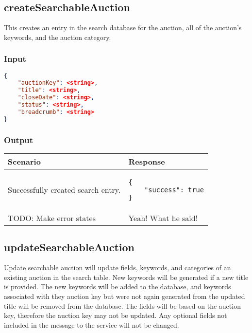 \documentclass[12pt,a4paper]{article}
\begin{document}
\subsection{createSearchableAuction}
\label{ref:csa}
This creates an entry in the search database for the auction, all of the
auction's keywords, and the auction category.

\subsubsection{Input}
\begin{lstlisting}[language=json,firstnumber=1]
{
    "auctionKey": <string>,
    "title": <string>,
    "closeDate": <string>,
    "status": <string>,
    "breadcrumb": <string>
}
\end{lstlisting}

\subsubsection{Output}
\begin{center}
    \begin{tabular}{| p{5cm} | l |}
        \hline
        \textbf{Scenario} & \textbf{Response} \\
        \hline
        Successfully created search entry. & 
        \begin{lstlisting}[boxpos=t,language=tableJson,firstnumber=1]
{
    "success": true
}
        \end{lstlisting} \\ 
        \hline
            TODO: Make error states & Yeah! What he said! \\
        \hline
    \end{tabular}
\end{center}


\subsection{updateSearchableAuction}
\label{ref:usa}
Update searchable auction will update fields, keywords, and categories of an
existing auction in the search table. New keywords will be generated if a new
title is provided. The new keywords will be added to the database, and keywords
associated with they auction key but were not again generated from the updated
title will be removed from the database. The fields will be based on the
auction key, therefore the auction key may not be updated. Any optional fields
not included in the message to the service will not be changed.
\end{document}
